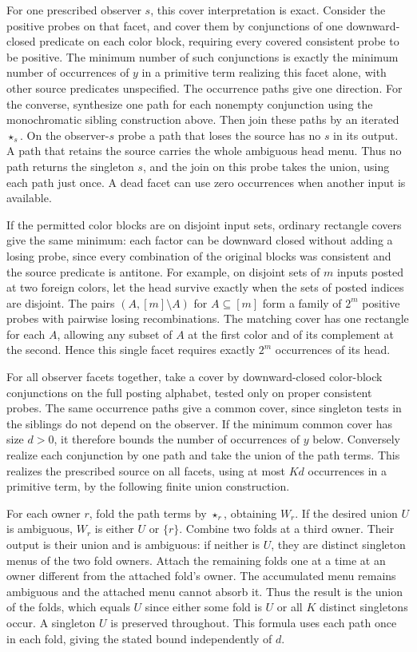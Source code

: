 For one prescribed observer $s$, this cover interpretation is
exact. Consider the positive probes on that facet, and cover
them by conjunctions of one downward-closed predicate on each
color block, requiring every covered consistent probe to be
positive. The minimum number of such conjunctions is exactly
the minimum number of occurrences of $y$ in a primitive term
realizing this facet alone, with other source predicates
unspecified. The occurrence paths give one direction. For
the converse, synthesize one path for each nonempty conjunction
using the monochromatic sibling construction above. Then join
these paths by an iterated $\star_s$. On the observer-$s$ probe
a path that loses the source has no $s$ in its output. A path
that retains the source carries the whole ambiguous head menu.
Thus no path returns the singleton $s$, and the join on this
probe takes the union, using each path just once. A dead facet
can use zero occurrences when another input is available.

If the permitted color blocks are on disjoint input sets,
ordinary rectangle covers give the same minimum: each factor
can be downward closed without adding a losing probe, since
every combination of the original blocks was consistent and
the source predicate is antitone. For example, on disjoint
sets of $m$ inputs posted at two foreign colors, let the head
survive exactly when the sets of posted indices are disjoint.
The pairs $(A,[m]\setminus A)$ for $A\subseteq[m]$ form a
family of $2^m$ positive probes with pairwise losing
recombinations. The matching cover has one rectangle for each
$A$, allowing any subset of $A$ at the first color and of its
complement at the second. Hence this single facet requires
exactly $2^m$ occurrences of its head.

For all observer facets together, take a cover by downward-closed
color-block conjunctions on the full posting alphabet, tested
only on proper consistent probes. The same occurrence paths
give a common cover, since singleton tests in the siblings do
not depend on the observer. If the minimum common cover has
size $d>0$, it therefore bounds the number of occurrences of
$y$ below. Conversely realize each conjunction by one path and
take the union of the path terms. This realizes the prescribed
source on all facets, using at most $Kd$ occurrences in a
primitive term, by the following finite union construction.

For each owner $r$, fold the path terms by $\star_r$, obtaining
$W_r$. If the desired union $U$ is ambiguous, $W_r$ is either
$U$ or $\{r\}$. Combine two folds at a third owner. Their output
is their union and is ambiguous: if neither is $U$, they are
distinct singleton menus of the two fold owners. Attach the
remaining folds one at a time at an owner different from the
attached fold's owner. The accumulated menu remains ambiguous
and the attached menu cannot absorb it. Thus the result is the
union of the folds, which equals $U$ since either some fold
is $U$ or all $K$ distinct singletons occur. A singleton $U$
is preserved throughout. This formula uses each path once in
each fold, giving the stated bound independently of $d$.

